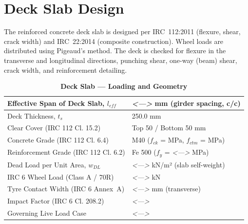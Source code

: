 \documentclass[12pt,a4paper]{report}
\numberwithin{table}{chapter}
\numberwithin{figure}{chapter}
\newcommand{\placeholder}[1]{\textit{\textless #1\textgreater}}
\begin{document}
\section{Deck Slab Design}
\label{sec:deck-design}

The reinforced concrete deck slab is designed per IRC~112:2011 (flexure, shear, crack width) and IRC~22:2014 (composite construction). Wheel loads are distributed using Pigeaud's method. The deck is checked for flexure in the transverse and longitudinal directions, punching shear, one-way (beam) shear, crack width, and reinforcement detailing.

\vspace{1em}
\begin{longtable}{|L{5.5cm}|p{10.0cm}|}
\caption{\textbf{Deck Slab --- Loading and Geometry}} \\
\hline
\textnormal{Effective Span of Deck Slab, $l_{eff}$} & \placeholder{---} mm (girder spacing, c/c) \\[6pt]
\hline
\textnormal{Deck Thickness, $t_s$} & 250.0 mm \\[6pt]
\hline
\textnormal{Clear Cover (IRC 112 Cl. 15.2)} & Top 50 / Bottom 50 mm \\[6pt]
\hline
\textnormal{Concrete Grade (IRC 112 Cl. 6.4)} & M40 ($f_{ck}$ =  MPa, $f_{ctm}$ =  MPa) \\[6pt]
\hline
\textnormal{Reinforcement Grade (IRC 112 Cl. 6.2)} & Fe 500 ($f_y$ = \placeholder{---} MPa) \\[6pt]
\hline
\textnormal{Dead Load per Unit Area, $w_{DL}$} & \placeholder{---} kN/m² (slab self-weight) \\[6pt]
\hline
\textnormal{IRC 6 Wheel Load (Class A / 70R)} & \placeholder{---} kN \\[6pt]
\hline
\textnormal{Tyre Contact Width (IRC 6 Annex~A)} & \placeholder{---} mm (transverse) \\[6pt]
\hline
\textnormal{Impact Factor (IRC 6 Cl. 208.2)} & \placeholder{---} \\[6pt]
\hline
\textnormal{Governing Live Load Case} & \placeholder{---} \\[6pt]
\hline
\end{longtable}
\end{document}
